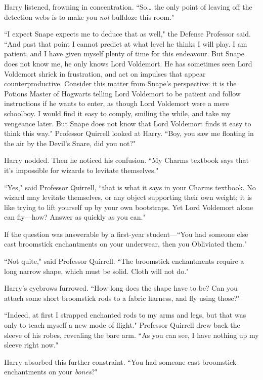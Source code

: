 Harry listened, frowning in concentration. ``So{\ldots} the only point of leaving off the detection webs is to make you \emph{not} bulldoze this room."

``I expect Snape expects me to deduce that as well," the Defense Professor said. ``And past that point I cannot predict at what level he thinks I will play. I am patient, and I have given myself plenty of time for this endeavour. But Snape does not know me, he only knows Lord Voldemort. He has sometimes seen Lord Voldemort shriek in frustration, and act on impulses that appear counterproductive. Consider this matter from Snape's perspective: it is the Potions Master of Hogwarts telling Lord Voldemort to be patient and follow instructions if he wants to enter, as though Lord Voldemort were a mere schoolboy. I would find it easy to comply, smiling the while, and take my vengeance later. But Snape does not know that Lord Voldemort finds it easy to think this way." Professor Quirrell looked at Harry. ``Boy, you saw me floating in the air by the Devil's Snare, did you not?"

Harry nodded. Then he noticed his confusion. ``My Charms textbook says that it's impossible for wizards to levitate themselves."

``Yes," said Professor Quirrell, ``that is what it says in your Charms textbook. No wizard may levitate themselves, or any object supporting their own weight; it is like trying to lift yourself up by your own bootstraps. Yet Lord Voldemort alone can fly---how? Answer as quickly as you can."

If the question was answerable by a first-year student---``You had someone else cast broomstick enchantments on your underwear, then you Obliviated them."

``Not quite," said Professor Quirrell. ``The broomstick enchantments require a long narrow shape, which must be solid. Cloth will not do."

Harry's eyebrows furrowed. ``How long does the shape have to be? Can you attach some short broomstick rods to a fabric harness, and fly using those?"

``Indeed, at first I strapped enchanted rods to my arms and legs, but that was only to teach myself a new mode of flight." Professor Quirrell drew back the sleeve of his robes, revealing the bare arm. ``As you can see, I have nothing up my sleeve right now."

Harry absorbed this further constraint. ``You had someone cast broomstick enchantments on your \emph{bones}?"

